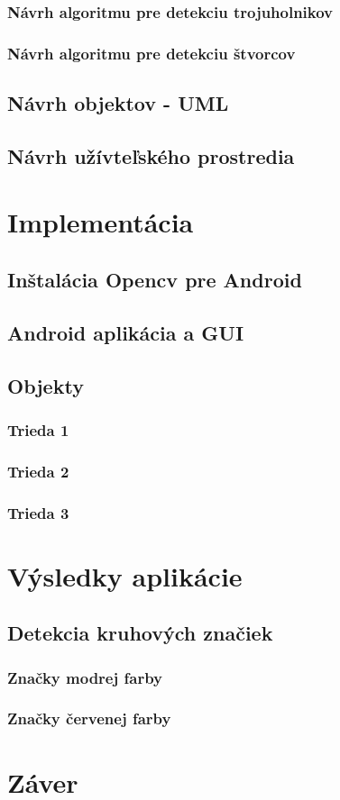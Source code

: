 \documentclass[12pt]{article}
\begin{document}
\subsubsection{Návrh algoritmu pre detekciu trojuholnikov}
\subsubsection{Návrh algoritmu pre detekciu štvorcov}
\subsection{Návrh objektov - UML}
\subsection{Návrh užívteľského prostredia}

\section{Implementácia}
\subsection{Inštalácia Opencv pre Android}
\subsection{Android aplikácia a GUI}
\subsection{Objekty}
\subsubsection{Trieda 1}
\subsubsection{Trieda 2}
\subsubsection{Trieda 3}

\section{Výsledky aplikácie}
\subsection{Detekcia kruhových značiek}
\subsubsection{Značky modrej farby}
\subsubsection{Značky červenej farby}

\section{Záver}



\end{document}
